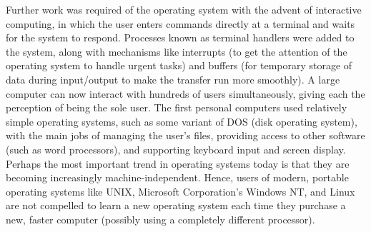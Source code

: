 \documentclass[a4paper, 12pt]{extarticle}
\begin{document}
Further work was required of the operating system with the advent of interactive
computing, in which the user enters commands directly at a terminal and waits
for the system to respond. Processes known as terminal handlers were added to
the system, along with mechanisms like interrupts (to get the attention of the
operating system to handle urgent tasks) and buffers (for temporary storage of
data during input/output to make the transfer run more smoothly). A large
computer can now interact with hundreds of users simultaneously, giving each the
perception of being the sole user. The first personal computers used relatively
simple operating systems, such as some variant of DOS (disk operating system),
with the main jobs of managing the user's files, providing access to other
software (such as word processors), and supporting keyboard input and screen
display. Perhaps the most important trend in operating systems today is that
they are becoming increasingly machine-independent. Hence, users of modern,
portable operating systems like UNIX, Microsoft Corporation's Windows NT, and
Linux are not compelled to learn a new operating system each time they purchase
a new, faster computer (possibly using a completely different processor).
\end{document}
